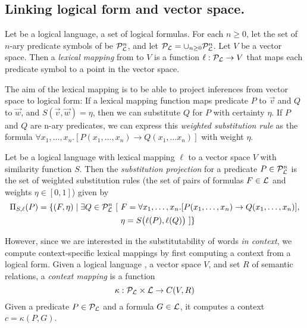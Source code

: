 \subsection*{Linking logical form and vector space.} 

Let \loglang be a logical language, a set of logical formulas. For each $n \ge
0$, let the set of $n$-ary predicate symbols of \loglang be
${\cal{P}}_{{\cal{L}}}^n$, and let ${\cal{P}}_{{\cal{L}}} = \cup_{n \ge 0}
{\cal{P}}_{{\cal{L}}}^n$. Let $V$ be a vector space. Then a \emph{lexical mapping}
from \loglang to $V$ is a function $\ell:
{\cal{P}}_{{\cal{L}}} \to V$ that maps each predicate symbol to a point in the
vector space.

The aim of the lexical mapping is to be able to project inferences from vector
space to logical form: If a lexical mapping function maps predicate $P$ to $\vec
v$ and $Q$ to $ \vec w$, and $S(\vec v, \vec w) = \eta$, then we can substitute
$Q$ for $P$ with certainty $\eta$. If $P$ and $Q$ are n-ary predicates, we can
express this {\it weighted substitution rule} as the formula $\forall x_1,
\ldots, x_n.[P(x_1, \ldots, x_n) \to Q(x_1, \ldots x_n)]$ with weight $\eta$.

Let \loglang be a logical language with lexical mapping $\ell$ to a vector space
$V$ with similarity function $S$. Then the \textit{substitution projection} 
for a predicate $P \in {\cal{P}}_{{\cal{L}}}^n$ is the set of weighted substitution
rules (the set of pairs of formulas $F \in {\cal{L}}$ and weights $\eta \in
[0,1]$) given by
\begin{align*}
\Pi_{S, \ell}(P) = \{ (F, \eta) \mid \exists Q \in {\cal{P}}_{{\cal{L}}}^n~[ 
&~F = \forall x_1, \ldots, x_n.[P(x_1, \ldots, x_n) \to Q(x_1, \ldots, x_n)], \\
&~\eta = S\big(\ell(P), \ell(Q)\big) ~] \}
\end{align*}

However, since we are interested in the substitutability of words {\it in
context}, we compute context-specific lexical mappings by first computing a
context from a logical form. Given a logical language \loglang, a vector space
$V$, and set $R$ of semantic relations, a \textit{context mapping} is a function
\[ \kappa: {\cal{P}}_{{\cal{L}}} \times {\cal{L}} \to C(V, R) \] Given a predicate
$P \in {\cal{P}}_{{\cal{L}}}$ and a formula $G \in {\cal{L}}$, it computes a context
$c = \kappa(P, G)$.

